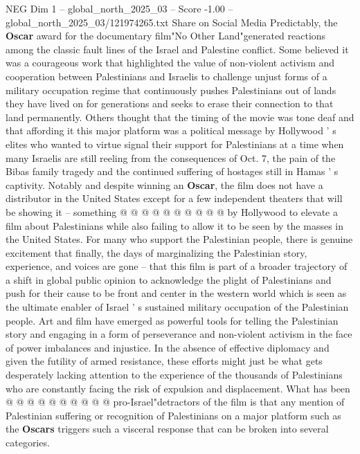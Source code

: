 \begin{textsample}{NEG Dim 1 – global\_north\_2025\_03 – Score -1.00 – global\_north\_2025\_03/121974265.txt}  \label{ex:f1_neg_032}
Share on Social Media Predictably, the \textbf{Oscar} award for the documentary film"No Other Land"generated reactions among the classic fault lines of the Israel and Palestine conflict.
Some believed it was a courageous work that highlighted the value of non-violent activism and cooperation between Palestinians and Israelis to challenge unjust forms of a military occupation regime that continuously pushes Palestinians out of lands they have lived on for generations and seeks to erase their connection to that land permanently.
Others thought that the timing of the movie was tone deaf and that affording it this major platform was a political message by Hollywood ' s elites who wanted to virtue signal their support for Palestinians at a time when many Israelis are still reeling from the consequences of Oct. 7, the pain of the Bibas family tragedy and the continued suffering of hostages still in Hamas ' s captivity.
Notably and despite winning an \textbf{Oscar}, the film does not have a distributor in the United States except for a few independent theaters that will be showing it -- something @ @ @ @ @ @ @ @ @ @ by Hollywood to elevate a film about Palestinians while also failing to allow it to be seen by the masses in the United States.
For many who support the Palestinian people, there is genuine excitement that finally, the days of marginalizing the Palestinian story, experience, and voices are gone -- that this film is part of a broader trajectory of a shift in global public opinion to acknowledge the plight of Palestinians and push for their cause to be front and center in the western world which is seen as the ultimate enabler of Israel ' s sustained military occupation of the Palestinian people.
Art and film have emerged as powerful tools for telling the Palestinian story and engaging in a form of perseverance and non-violent activism in the face of power imbalances and injustice.
In the absence of effective diplomacy and given the futility of armed resistance, these efforts might just be what gets desperately lacking attention to the experience of the thousands of Palestinians who are constantly facing the risk of expulsion and displacement.
What has been @ @ @ @ @ @ @ @ @ @ pro-Israel"detractors of the film is that any mention of Palestinian suffering or recognition of Palestinians on a major platform such as the \textbf{Oscars} triggers such a visceral response that can be broken into several categories.

\end{textsample}
